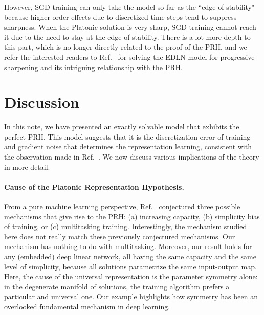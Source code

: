 \documentclass[11pt]{article}
\theoremstyle{plain}
\begin{document}
However, SGD training can only take the model so far as the ``edge of stability" because higher-order effects due to discretized time steps tend to suppress sharpness. When the Platonic solution is very sharp, SGD training cannot reach it due to the need to stay at the edge of stability. There is a lot more depth to this part, which is no longer directly related to the proof of the PRH, and we refer the interested readers to Ref.~\cite{ziyin2025neural} for solving the EDLN model for progressive sharpening and its intriguing relationship with the PRH.

\section{Discussion}\label{sec: discussion}

In this note, we have presented an exactly solvable model that exhibits the perfect PRH. This model suggests that it is the discretization error of training and gradient noise that determines the representation learning, consistent with the observation made in Ref.~\cite{ziyin2024formation}. We now discuss various implications of the theory in more detail.

\vspace{-1mm}
\paragraph{Cause of the Platonic Representation Hypothesis.} From a pure machine learning perspective, Ref.~\cite{huh2024platonic} conjectured three possible mechanisms that give rise to the PRH: (a) increasing capacity, (b) simplicity bias of training, or (c) multitasking training. Interestingly, the mechanism studied here does not really match these previously conjectured mechanisms. Our mechanism has nothing to do with multitasking.  Moreover, our result holds for any (embedded) deep linear network, all having the same capacity and the same level of simplicity, because all solutions parametrize the same input-output map. Here, the cause of the universal representation is the parameter symmetry alone: in the degenerate manifold of solutions, the training algorithm prefers a particular and universal one. Our example highlights how symmetry has been an overlooked fundamental mechanism in deep learning. %

\vspace{-1mm}
\end{document}
